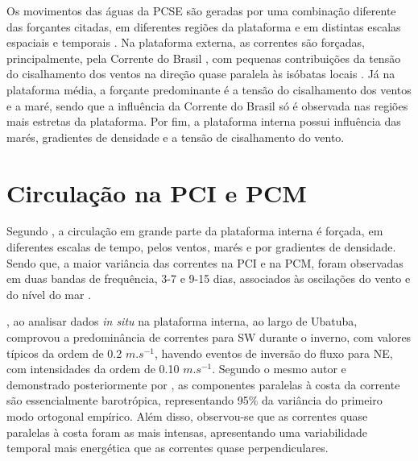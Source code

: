 \hspace{5mm} Os movimentos das águas da PCSE são geradas por uma combinação diferente das forçantes citadas, em diferentes regiões da plataforma e em distintas escalas espaciais e temporais \citep{castro1996correntes}. Na plataforma externa, as correntes são forçadas, principalmente, pela Corrente do Brasil \citep{castro2008processos}, com pequenas contribuições da tensão do cisalhamento dos ventos na direção quase paralela às isóbatas locais \citep{dottori2009response}. Já na plataforma média, a forçante predominante é a tensão do cisalhamento dos ventos e a maré, sendo que a influência da Corrente do Brasil só é observada nas regiões mais estretas da plataforma. Por fim, a plataforma interna possui influência das marés, gradientes de densidade e a tensão de cisalhamento do vento.


\section{Circulação na PCI e PCM}

\hspace{5mm} Segundo \cite{castro1996correntes}, a circulação em grande parte da plataforma interna é forçada, em diferentes escalas de tempo, pelos ventos, marés e por gradientes de densidade. Sendo que, a maior variância das correntes na PCI e na PCM, foram observadas em duas bandas de frequência, 3-7 e 9-15 dias, associados às oscilações do vento e do nível do mar \citep{castro1998physical}.

\hspace{5mm} \cite{castro1996correntes}, ao analisar dados \textit{in situ} na plataforma interna, ao largo de Ubatuba, comprovou a predominância de correntes para SW durante o inverno, com valores típicos da ordem de 0.2 $m.s^{-1}$, havendo eventos de inversão do fluxo para NE, com intensidades da ordem de 0.10 $m.s^{-1}$. Segundo o mesmo autor e demonstrado posteriormente por \cite{dottori2009response}, as componentes paralelas à costa da corrente são essencialmente barotrópica, representando 95$\%$ da variância do primeiro modo ortogonal empírico. Além disso, observou-se que as correntes quase paralelas à costa foram as mais intensas, apresentando uma variabilidade temporal mais energética que as correntes quase perpendiculares.

